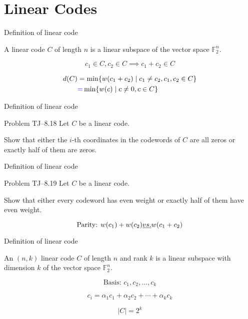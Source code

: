 \section{Linear Codes}

\begin{frame}{Definition of linear code}
  \begin{definition}
	A linear code $C$ of length $n$ is a linear subspace of the vector space $\mathbb{F}_2^n$.
  \end{definition}

  \[
	c_1 \in C, c_2 \in C \implies c_1 + c_2 \in C
  \]

  \[
	\begin{aligned}
	  d(C) &= \min \{w(c_1 + c_2) \mid c_1 \neq c_2, c_1, c_2 \in C\} \\
	  &{\textcolor{blue}{=}} \min \{w(c) \mid c \neq 0, c \in C\}
	\end{aligned}
  \]
\end{frame}
\begin{frame}{Definition of linear code}
  \begin{exampleblock}{Problem TJ--8.18}
	Let $C$ be a linear code.

	Show that either the $i$-th coordinates in the codewords of $C$ are all zeros
	or exactly half of them are zeros.
  \end{exampleblock}
\end{frame}
\begin{frame}{Definition of linear code}
  \begin{exampleblock}{Problem TJ--8.19}
	Let $C$ be a linear code.

	Show that either every codeword has even weight
	or exactly half of them have even weight.
  \end{exampleblock}

  \[
	\text{Parity: } w(c_1) + w(c_2) \emph{ vs. } w(c_1 + c_2)
  \]
\end{frame}
\begin{frame}{Definition of linear code}
  \begin{definition}
	An $(n,k)$ linear code $C$ of length $n$ and rank $k$ is a linear subspace with dimension $k$ of the vector space $\mathbb{F}_2^n$.
  \end{definition}

  \[
	\text{Basis: } c_1, c_2, \dots, c_k
  \]

  \[
	c_i = \alpha_1 c_1 + \alpha_2 c_2 + \cdots + \alpha_k c_k
  \]

  \[
	|C| = 2^k
  \]
\end{frame}

